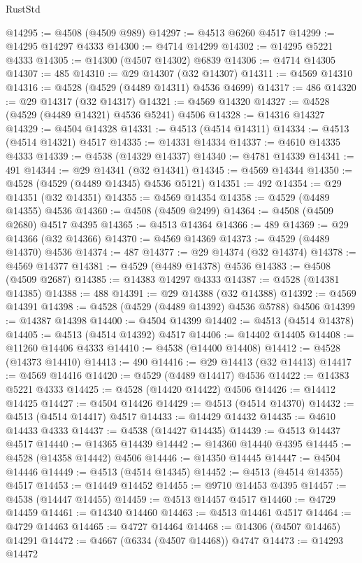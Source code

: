 \begin{lexlean}{RustStd}
\begin{coremodule}
@14295 := @4508 (@4509 @989)
@14297 := @4513 @6260 @4517
@14299 := @14295 @14297 @4333
@14300 := @4714 @14299
@14302 := @14295 @5221 @4333
@14305 := @14300 (@4507 @14302) @6839
@14306 := @4714 @14305
@14307 := 485
@14310 := @29 @14307 (@32 @14307)
@14311 := @4569 @14310
@14316 := @4528 (@4529 (@4489 @14311) @4536 @4699)
@14317 := 486
@14320 := @29 @14317 (@32 @14317)
@14321 := @4569 @14320
@14327 := @4528 (@4529 (@4489 @14321) @4536 @5241) @4506
@14328 := @14316 @14327
@14329 := @4504 @14328
@14331 := @4513 (@4514 @14311)
@14334 := @4513 (@4514 @14321) @4517
@14335 := @14331 @14334
@14337 := @4610 @14335 @4333
@14339 := @4538 (@14329 @14337)
@14340 := @4781 @14339
@14341 := 491
@14344 := @29 @14341 (@32 @14341)
@14345 := @4569 @14344
@14350 := @4528 (@4529 (@4489 @14345) @4536 @5121)
@14351 := 492
@14354 := @29 @14351 (@32 @14351)
@14355 := @4569 @14354
@14358 := @4529 (@4489 @14355) @4536
@14360 := @4508 (@4509 @2499)
@14364 := @4508 (@4509 @2680) @4517 @4395
@14365 := @4513 @14364
@14366 := 489
@14369 := @29 @14366 (@32 @14366)
@14370 := @4569 @14369
@14373 := @4529 (@4489 @14370) @4536
@14374 := 487
@14377 := @29 @14374 (@32 @14374)
@14378 := @4569 @14377
@14381 := @4529 (@4489 @14378) @4536
@14383 := @4508 (@4509 @2687)
@14385 := @14383 @14297 @4333
@14387 := @4528 (@14381 @14385)
@14388 := 488
@14391 := @29 @14388 (@32 @14388)
@14392 := @4569 @14391
@14398 := @4528 (@4529 (@4489 @14392) @4536 @5788) @4506
@14399 := @14387 @14398
@14400 := @4504 @14399
@14402 := @4513 (@4514 @14378)
@14405 := @4513 (@4514 @14392) @4517
@14406 := @14402 @14405
@14408 := @11260 @14406 @4333
@14410 := @4538 (@14400 @14408)
@14412 := @4528 (@14373 @14410)
@14413 := 490
@14416 := @29 @14413 (@32 @14413)
@14417 := @4569 @14416
@14420 := @4529 (@4489 @14417) @4536
@14422 := @14383 @5221 @4333
@14425 := @4528 (@14420 @14422) @4506
@14426 := @14412 @14425
@14427 := @4504 @14426
@14429 := @4513 (@4514 @14370)
@14432 := @4513 (@4514 @14417) @4517
@14433 := @14429 @14432
@14435 := @4610 @14433 @4333
@14437 := @4538 (@14427 @14435)
@14439 := @4513 @14437 @4517
@14440 := @14365 @14439
@14442 := @14360 @14440 @4395
@14445 := @4528 (@14358 @14442) @4506
@14446 := @14350 @14445
@14447 := @4504 @14446
@14449 := @4513 (@4514 @14345)
@14452 := @4513 (@4514 @14355) @4517
@14453 := @14449 @14452
@14455 := @9710 @14453 @4395
@14457 := @4538 (@14447 @14455)
@14459 := @4513 @14457 @4517
@14460 := @4729 @14459
@14461 := @14340 @14460
@14463 := @4513 @14461 @4517
@14464 := @4729 @14463
@14465 := @4727 @14464
@14468 := @14306 (@4507 @14465) @14291
@14472 := @4667 (@6334 (@4507 @14468)) @4747
@14473 := @14293 @14472

\end{coremodule}
\end{lexlean}
